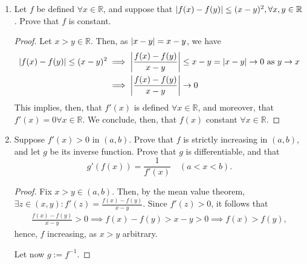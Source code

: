 \begin{example}
    \begin{enumerate}
        \item Let $f$ be defined $\forall x \in \mathbb{R}$, and suppose that $\abs{f(x) - f(y)} \leq (x - y)^2, \forall x, y \in \mathbb{R}$. Prove that $f$ is constant.\footnotemark
        \begin{proof}
            Let $x > y \in \mathbb{R}$. Then, as $\abs{x - y} = x - y$, we have \begin{align*}
                \abs{f(x) - f(y)} \leq (x - y)^2 &\implies \abs{\frac{f(x) - f(y)}{x - y}} \leq x - y = \abs{x - y} \to 0 \text{ as } y \to x\\
                &\implies \abs{\frac{f(x) - f(y)}{x - y}} \to 0
            \end{align*}
            This implies, then, that $f'(x)$ is defined $\forall x \in \mathbb{R}$, and moreover, that $f'(x) = 0 \forall x \in \mathbb{R}$. We conclude, then, that $f(x)$ constant $\forall x \in \mathbb{R}$.
        \end{proof}
    
        \item Suppose $f'(x) > 0$ in $(a, b)$. Prove that $f$ is strictly increasing in $(a, b)$, and let $g$ be its inverse function. Prove that $g$ is differentiable, and that \[
        g'(f(x)) = \frac{1}{f'(x)}   \quad (a < x < b).
        \]
        \begin{proof}
            Fix $x > y \in (a, b)$. Then, by the mean value theorem, $\exists z \in (x, y) : f'(z) = \frac{f(x) - f(y)}{x - y}$. Since $f'(z) > 0$, it follows that \begin{align*}
                \frac{f(x) - f(y)}{x - y} > 0 \implies f(x) - f(y) > x - y > 0 \implies f(x) > f(y),
            \end{align*}
            hence, $f$ increasing, as $x > y$ arbitrary.

            Let now $g := f^{-1}$.
        \end{proof}
    \end{enumerate}
\end{example}


